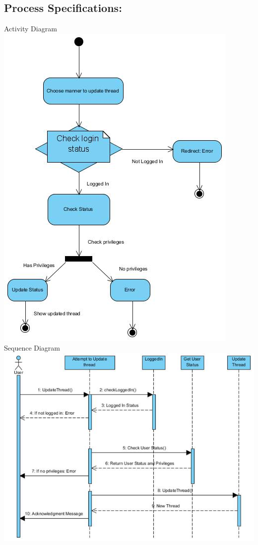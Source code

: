 \documentclass[a4paper,11pt]{article}
\begin{document}
\subsection{Process Specifications:} 
Activity Diagram\\
\includegraphics[width=1\linewidth]{./Images/CRUDThread/Diagrams/11.jpg}\\
\newpage
Sequence Diagram\\
\includegraphics[width=1\linewidth]{./Images/CRUDThread/Diagrams/12.jpg}\\
\end{document}
